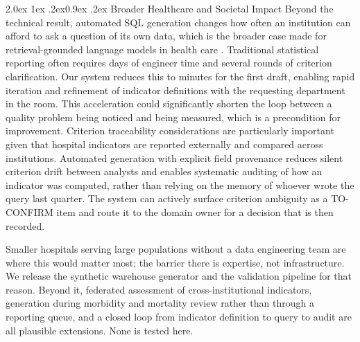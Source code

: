 \documentclass[10pt,twocolumn]{article}
\makeatletter
\renewcommand\subsection{\@startsection{subsection}{2}{\z@}%
  {2.0ex \@plus 1ex \@minus .2ex}{0.9ex \@plus .2ex}%
  {\normalfont\normalsize\bfseries}}
\makeatother
\begin{document}
\subsection{Broader Healthcare and Societal Impact}
Beyond the technical result, automated SQL generation changes how often an institution can afford to ask a question of its own data, which is the broader case made for retrieval-grounded language models in health care \cite{ng2025}. Traditional statistical reporting often requires
days of engineer time and several rounds of criterion clarification. Our system
reduces this to minutes for the first draft, enabling rapid iteration and
refinement of indicator definitions with the requesting department in the room.
This acceleration could significantly shorten the loop between a quality problem
being noticed and being measured, which is a precondition for improvement.
Criterion traceability considerations are particularly important given that
hospital indicators are reported externally and compared across institutions.
Automated generation with explicit field provenance reduces silent
criterion drift between analysts and enables systematic auditing of how an
indicator was computed, rather than relying on the memory of whoever wrote the
query last quarter. The system can actively surface criterion ambiguity as a
TO-CONFIRM item and route it to the domain owner for a decision that is then
recorded.

Smaller hospitals serving large populations without a data engineering team are where this would matter most; the barrier there is expertise, not infrastructure. We release the synthetic warehouse generator and the validation pipeline for that reason. Beyond it, federated assessment of cross-institutional indicators, generation during morbidity and mortality review rather than through a reporting queue, and a closed loop from indicator definition to query to audit are all plausible extensions. None is tested here.
\end{document}
